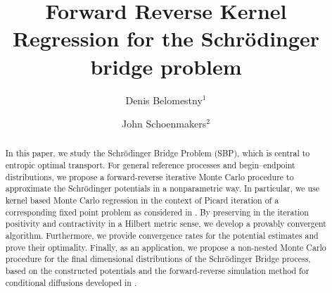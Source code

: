 \documentclass[a4paper,11pt]{amsart}
\theoremstyle{plain}
\theoremstyle{remark}
\begin{document}
\title[Schr\"{o}dinger bridge problem]
{%
Forward Reverse Kernel  Regression  for the Schr\"{o}dinger bridge problem }
\author[D.~Belomestny]{Denis Belomestny$^{1}$}
\address{$^1$Faculty of Mathematics\\
Duisburg-Essen University\\
Thea-Leymann-Str.~9\\
D-45127 Essen\\
Germany}

\author[J.~Schoenmakers]{John Schoenmakers$^{2}$}
\address{$^2$Weierstrass Institute for Applied Analysis and Stochastics \\
\mbox{Mohrenstr.~39} \\
10117 Berlin \\
Germany}





\date{}

\begin{abstract}
In this paper, we study the Schr\"odinger Bridge Problem (SBP), which is central to entropic optimal transport.
For general reference processes and begin--endpoint distributions, we propose a forward-reverse iterative Monte Carlo procedure to approximate the Schr\"odinger potentials in a nonparametric way. In particular, we use kernel based Monte Carlo regression in the context of Picard iteration of a corresponding fixed point problem as considered in \cite{CGP2016}. By preserving   in the iteration positivity and contractivity in a Hilbert metric sense, we develop a provably convergent algorithm. Furthermore, we provide convergence rates for the potential estimates and prove their optimality. {Finally, as an application, we propose a non-nested  Monte Carlo procedure for the final dimensional distributions of the
Schr\"odinger Bridge process, based on the constructed potentials and the forward-reverse simulation method for conditional diffusions developed in \cite{BS2014}. %
}

\end{abstract}

\maketitle
\end{document}
